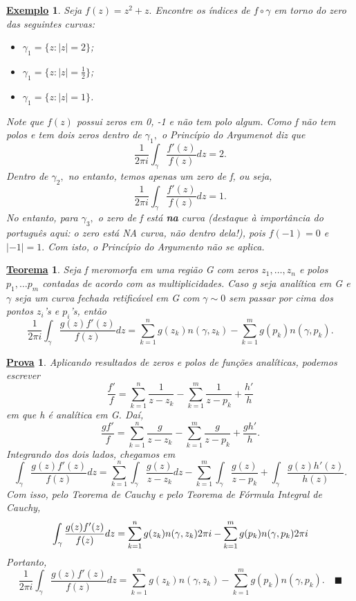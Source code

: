 \documentclass{article}
\newtheorem*{theorem*}{\underline{Teorema}}
\newtheorem{example}{\underline{Exemplo}}[section]
\newtheorem*{proof*}{\underline{Prova}}
\renewcommand\qedsymbol{$\blacksquare$}
\begin{document}
  \begin{example}
    Seja \(f(z) = z^{2} + z.\) Encontre os índices de \(f\circ \gamma \) em torno do zero das seguintes curvas:
    \begin{itemize}
      \item[1)] \(\gamma_{1} = \{z: |z| = 2\}\);
      \item[2)] \(\gamma_{1} = \{z: |z| = \frac{1}{2}\}\);
      \item[3)] \(\gamma_{1} = \{z: |z| = 1\}\).
    \end{itemize}
    Note que \(f(z)\) possui zeros em 0, -1 e não tem polo algum. Como f não tem polos e tem dois zeros dentro de \(\gamma_{1},\) o Princípio do Argumenot
    diz que 
    \[
      \frac{1}{2\pi i}\int_{\gamma }^{}\frac{f'(z)}{f(z)}dz = 2.
    \]
    Dentro de \(\gamma_{2},\) no entanto, temos apenas um zero de f, ou seja, 
    \[
      \frac{1}{2\pi i}\int_{\gamma }^{}\frac{f'(z)}{f(z)}dz = 1.
    \]
    No entanto, para \(\gamma_{3},\) o zero de f está \textbf{na} curva (destaque à importância do português aqui: o zero está NA curva, não dentro dela!), pois \(f(-1) = 0\) e \(|-1| = 1.\) Com isto, o Princípio do Argumento
    não se aplica.
  \end{example}
  \begin{theorem*}
    Seja f meromorfa em uma região G com zeros \(z_{1},\dotsc , z_{n}\) e polos \(p_{1},\dotsc p_{m}\) 
    contadas de acordo com as multiplicidades. Caso g seja analítica em G e \(\gamma \) seja um curva fechada retificável em G
    com \(\gamma \sim 0\) sem passar por cima dos pontos \(z_{i}\)'s e \(p_{i}\)'s, então 
    \[
      \frac{1}{2\pi i}\int_{\gamma }^{}\frac{g(z)f'(z)}{f(z)}dz = \sum\limits_{k=1}^{n}g(z_{k})n(\gamma , z_{k}) - \sum\limits_{k=1}^{m}g(p_{k})n(\gamma , p_{k}).
    \]
  \end{theorem*}
  \begin{proof*}
    Aplicando resultados de zeros e polos de funções analíticas, podemos escrever 
    \[
      \frac{f'}{f} = \sum\limits_{k=1}^{n}\frac{1}{z-z_{k}} - \sum\limits_{k=1}^{m}\frac{1}{z-p_{k}} + \frac{h'}{h}
    \] 
    em que h é analítica em G. Daí,
    \[
      \frac{gf'}{f} = \sum\limits_{k=1}^{n}\frac{g}{z-z_{k}} - \sum\limits_{k=1}^{m}\frac{g}{z-p_{k}} + \frac{gh'}{h}.
    \]
    Integrando dos dois lados, chegamos em 
    \[
      \int_{\gamma }^{}\frac{g(z)f'(z)}{f(z)}dz = \sum\limits_{k=1}^{n}\int_{\gamma }^{}\frac{g(z)}{z-z_{k}}dz - \sum\limits_{k=1}^{m}\int_{\gamma }^{}\frac{g(z)}{z-p_{k}} + \int_{\gamma }^{}\frac{g(z)h'(z)}{h(z)}.
    \]
    Com isso, pelo Teorema de Cauchy e pelo Teorema de Fórmula Integral de Cauchy,
    \[
      \int_{\gamma }^{}\frac{g(z)f'(z)}{f(z)}dz = \sum\limits_{k=1}^{n}g(z_{k})n(\gamma , z_{k})2\pi i - \sum\limits_{k=1}^{m}g(p_{k})n(\gamma , p_{k})2\pi i\\
    \]
    Portanto,
    \[
      \frac{1}{2\pi i}\int_{\gamma }^{}\frac{g(z)f'(z)}{f(z)}dz = \sum\limits_{k=1}^{n}g(z_{k})n(\gamma , z_{k}) - \sum\limits_{k=1}^{m}g(p_{k})n(\gamma , p_{k}).\quad \text{\qedsymbol}
    \]
  \end{proof*}
\end{document}
